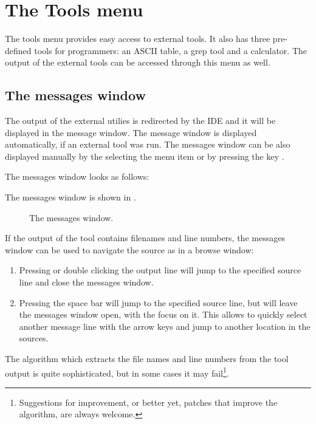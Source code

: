 \section{The Tools menu}
\label{se:toolsmenu}
The tools menu provides easy access to external tools. It also has
three pre-defined tools for programmers: an ASCII table,  a grep tool
and a calculator. The output of the external tools can be accessed through
this menu as well.

%
%
\subsection{The messages window}
\label{se:toolsmessages}
The output of the external utilies is redirected by the IDE and it
will be displayed in the message window. The message window is
displayed automatically, if an external tool was run. The
messages window can be also displayed manually by the selecting the
menu item  or by pressing the key .

\begin{htmlonly}
The messages window looks as follows:
\end{htmlonly}
\begin{latexonly}
The messages window is shown in .
\begin{figure}[ht]
\caption{The messages window.}\label{fig:messages}
\ifpdf
{}
\else
{}
\fi
\end{figure}
\end{latexonly}
If the output of the tool contains filenames and line numbers,
the messages window can be used to navigate the source as in a browse
window:
\begin{enumerate}
\item Pressing  or double clicking the output line will jump
to the specified source line and close the messages window.
\item Pressing the space bar will jump to the specified source line, but
will leave the messages window open, with the focus on it. This allows to
quickly select another message line with the arrow keys and jump to 
another location in the sources.
\end{enumerate}
The algorithm which extracts the file names and line numbers from
the tool output is quite sophisticated, but in some cases it may
fail\footnote{Suggestions for improvement, or better yet, patches
that improve the algorithm, are always welcome.}.
%
%
